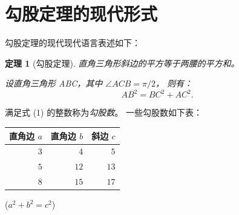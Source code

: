 \documentclass[UTF8]{ctexart}
\newtheorem{thm}{定理}          %
\begin{document}
    \section{勾股定理的现代形式}
        勾股定理的现代现代语言表述如下\cite{Shiye}：
        \begin{thm}[勾股定理]
            直角三角形斜边的平方等于两腰的平方和。

            设直角三角形 ABC，其中 $\angle ACB = \pi / 2$，
            则有：
            \begin{equation}
                AB^2 = BC^2 + AC^2.
            \end{equation}
        \end{thm}

        满足式 (1) 的整数称为\emph{勾股数}。
        一些勾股数如下表：\\[3pt]

        \begin{table}[ht]
            \begin{tabular}{|rrr|}
                \hline
                直角边 $a$ & 直角边 $b$ & 斜边 $c$\\
                \hline
                $3$ & $4$ & $5$ \\
                \hline
                $5$ & $12$ & $13$ \\
                \hline
                $8$ & $15$ & $17$ \\
                \hline
            \end{tabular}
            \qquad
            ($a^2 + b^2 = c^2$)
        \end{table}

    
    
    
\end{document}
